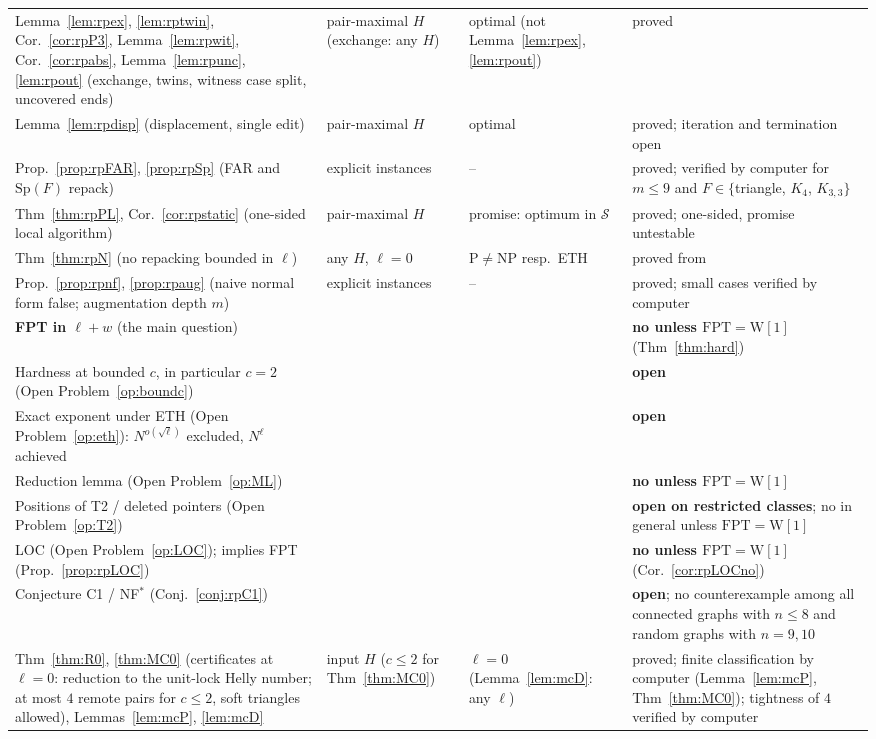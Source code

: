 {\begin{longtable}{@{}>{\raggedright\arraybackslash}p{}>{\raggedright\arraybackslash}p{}>{\raggedright\arraybackslash}p{}>{\raggedright\arraybackslash}p{}@{}}
Lemma~\ref{lem:rpex}, \ref{lem:rptwin}, Cor.~\ref{cor:rpP3}, Lemma~\ref{lem:rpwit}, Cor.~\ref{cor:rpabs}, Lemma~\ref{lem:rpunc}, \ref{lem:rpout} (exchange, twins, witness case split, uncovered ends) & pair-maximal $H$ (exchange: any $H$) & optimal (not Lemma~\ref{lem:rpex}, \ref{lem:rpout}) & proved\\
Lemma~\ref{lem:rpdisp} (displacement, single edit) & pair-maximal $H$ & optimal & proved; iteration and termination open\\
Prop.~\ref{prop:rpFAR}, \ref{prop:rpSp} (FAR and $\mathrm{Sp}(F)$ repack) & explicit instances & -- & proved; verified by computer for $m\le9$ and $F\in\{$triangle, $K_4$, $K_{3,3}\}$\\
Thm~\ref{thm:rpPL}, Cor.~\ref{cor:rpstatic} (one-sided local algorithm) & pair-maximal $H$ & promise: optimum in $\mathcal S$ & proved; one-sided, promise untestable\\
Thm~\ref{thm:rpN} (no repacking bounded in $\ell$) & any $H$, $\ell=0$ & $\mathrm P\ne\mathrm{NP}$ resp.\ ETH & proved from~\cite{LPS23}\\
Prop.~\ref{prop:rpnf}, \ref{prop:rpaug} (naive normal form false; augmentation depth $m$) & explicit instances & -- & proved; small cases verified by computer\\
\textbf{FPT in $\ell+w$} (the main question) & & & \textbf{no unless $\mathrm{FPT}=\mathrm{W[1]}$} (Thm~\ref{thm:hard})\\
Hardness at bounded $c$, in particular $c=2$ (Open Problem~\ref{op:boundc}) & & & \textbf{open}\\
Exact exponent under ETH (Open Problem~\ref{op:eth}): $N^{o(\sqrt\ell)}$ excluded, $N^{\ell}$ achieved & & & \textbf{open}\\
Reduction lemma (Open Problem~\ref{op:ML}) & & & \textbf{no unless $\mathrm{FPT}=\mathrm{W[1]}$}\\
Positions of T2 / deleted pointers (Open Problem~\ref{op:T2}) & & & \textbf{open on restricted classes}; no in general unless $\mathrm{FPT}=\mathrm{W[1]}$\\
LOC (Open Problem~\ref{op:LOC}); implies FPT (Prop.~\ref{prop:rpLOC}) & & & \textbf{no unless $\mathrm{FPT}=\mathrm{W[1]}$} (Cor.~\ref{cor:rpLOCno})\\
Conjecture C1 / NF$^*$ (Conj.~\ref{conj:rpC1}) & & & \textbf{open}; no counterexample among all connected graphs with $n\le8$ and random graphs with $n=9,10$\\
Thm~\ref{thm:R0}, \ref{thm:MC0} (certificates at $\ell=0$: reduction to the unit-lock Helly number; at most $4$ remote pairs for $c\le2$, soft triangles allowed), Lemmas~\ref{lem:mcP}, \ref{lem:mcD} & input $H$ ($c\le2$ for Thm~\ref{thm:MC0}) & $\ell=0$ (Lemma~\ref{lem:mcD}: any $\ell$) & proved; finite classification by computer (Lemma~\ref{lem:mcP}, Thm~\ref{thm:MC0}); tightness of $4$ verified by computer\\

\end{longtable}}

